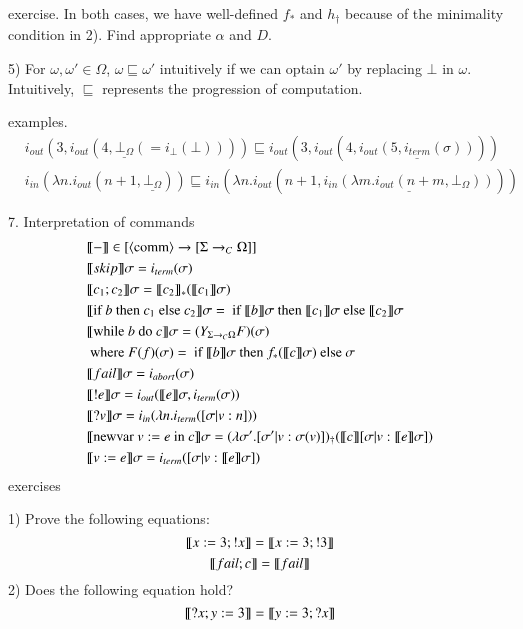 \documentclass{report}[12pt]
\begin{document}
exercise. In both cases, we have well-defined $f_*$ and $h_\dagger$ because of the minimality condition in 2). Find appropriate $\alpha$ and $D$.

5)
For $\omega, \omega' \in \Omega$, $\omega \sqsubseteq \omega'$ intuitively if we can optain $\omega'$ by replacing $\bot$ in $\omega$. Intuitively, $\sqsubseteq$ represents the progression of computation.

examples.
\begin{align*}
  &i_{out} (3, i_{out} (4, \underline{\bot_\Omega}(=i_\bot(\bot))))\sqsubseteq i_{out} (3, i_{out} (4, \underline{i_{out} (5, i_{term} (\sigma))})) \\
  &i_{in} (\lambda n. i_{out} (n + 1, \underline{\bot_\Omega})) \sqsubseteq i_{in} (\lambda n. i_{out} (n + 1, \underline{i_{in} (\lambda m. i_{out} (n + m, \bot_\Omega))}))
\end{align*}

7. Interpretation of commands
\begin{align*}
  &\llbracket - \rrbracket \in [\langle \text{comm}\rangle \rightarrow [\Sigma \rightarrow_C \Omega]] \\
  &\llbracket skip \rrbracket \sigma = i_{term}(\sigma)\\
  &\llbracket c_1; c_2 \rrbracket\sigma = \llbracket c_2 \rrbracket_* (\llbracket c_1 \rrbracket \sigma)\\
  &\llbracket \text{if }b \text{ then }c_1 \text{ else }c_2 \rrbracket \sigma = \text{ if }\llbracket b \rrbracket\sigma \text{ then }\llbracket c_1 \rrbracket \sigma\text{ else }\llbracket c_2 \rrbracket \sigma \\
  &\llbracket \text{while }b \text{ do }c \rrbracket\sigma = (Y_{\Sigma \rightarrow_C \Omega} F) (\sigma) \\
  &\text{  where }F(f)(\sigma) = \text{ if }\llbracket b \rrbracket\sigma \text{ then }f_* (\llbracket c \rrbracket\sigma) \text{ else }\sigma \\
  &\llbracket fail \rrbracket \sigma = i_{abort} (\sigma) \\
  &\llbracket !e \rrbracket \sigma = i_{out} (\llbracket e \rrbracket\sigma, i_{term} (\sigma)) \\
  &\llbracket ?v \rrbracket \sigma = i_{in} (\lambda n. i_{term}([\sigma|v:n])) \\
  &\llbracket \text{newvar }v:=e \text{ in }c \rrbracket\sigma =
  (\lambda \sigma'. [\sigma'|v:\sigma(v)])_\dagger (\llbracket c \rrbracket[\sigma|v:\llbracket e \rrbracket\sigma]) \\
  &\llbracket v:=e \rrbracket\sigma = i_{term}([\sigma|v:\llbracket e \rrbracket\sigma])
\end{align*}
exercises

1) Prove the following equations:
\[\llbracket x:=3;!x \rrbracket = \llbracket x:=3;!3 \rrbracket\]
\[\llbracket fail;c \rrbracket = \llbracket fail \rrbracket\]
2) Does the following equation hold?
\[\llbracket ?x;y:=3 \rrbracket = \llbracket y:=3;?x \rrbracket\]
\end{document}
